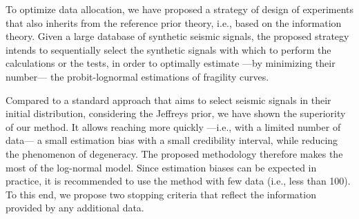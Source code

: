 
To optimize data allocation, we have proposed a strategy of design of experiments that also inherits from the reference prior theory, i.e., based on the information theory. Given a large database of synthetic seismic signals, the proposed strategy intends to sequentially select the synthetic signals with which to perform the calculations or the tests, in order to optimally estimate ---by minimizing their number--- the probit-lognormal estimations of fragility curves.

Compared to a standard approach that aims to select seismic signals in their initial distribution, considering the Jeffreys prior, we have shown the superiority of our method. It allows reaching more quickly ---i.e., with a limited number of data--- a small estimation bias with a small credibility interval, while reducing the phenomenon of degeneracy. The proposed methodology therefore makes the most of the log-normal model. Since estimation biases can be expected in practice, it is recommended to use the method with few data (i.e., less than 100). To this end, we propose two stopping criteria that reflect the information provided by any additional data.



